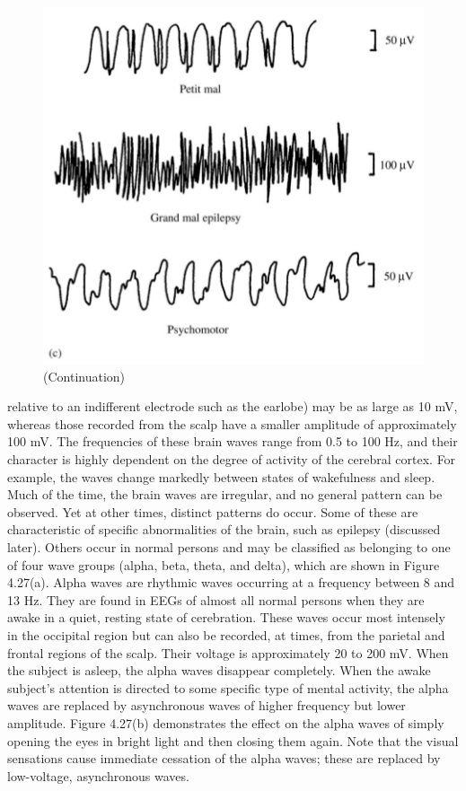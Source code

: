 \begin{figure}
\centering
\includegraphics[width=0.7\linewidth]{figura_5.png} 
\caption{(Continuation)}
\end{figure}

relative to an indifferent electrode such as the earlobe) may be as large as 10 mV,
whereas those recorded from the scalp have a smaller amplitude of approximately
100 mV. The frequencies of these brain waves range from 0.5 to 100 Hz, and their
character is highly dependent on the degree of activity of the cerebral cortex. For
example, the waves change markedly between states of wakefulness and sleep.
Much of the time, the brain waves are irregular, and no general pattern can be
observed. Yet at other times, distinct patterns do occur. Some of these are
characteristic of specific abnormalities of the brain, such as epilepsy (discussed
later). Others occur in normal persons and may be classified as belonging to one of
four wave groups (alpha, beta, theta, and delta), which are shown in Figure 4.27(a).
Alpha waves are rhythmic waves occurring at a frequency between 8 and
13 Hz. They are found in EEGs of almost all normal persons when they are
awake in a quiet, resting state of cerebration. These waves occur most intensely
in the occipital region but can also be recorded, at times, from the parietal and
frontal regions of the scalp. Their voltage is approximately 20 to 200 mV. When
the subject is asleep, the alpha waves disappear completely. When the awake
subject’s attention is directed to some specific type of mental activity, the alpha
waves are replaced by asynchronous waves of higher frequency but lower
amplitude. Figure 4.27(b) demonstrates the effect on the alpha waves of simply
opening the eyes in bright light and then closing them again. Note that the
visual sensations cause immediate cessation of the alpha waves; these are
replaced by low-voltage, asynchronous waves.


